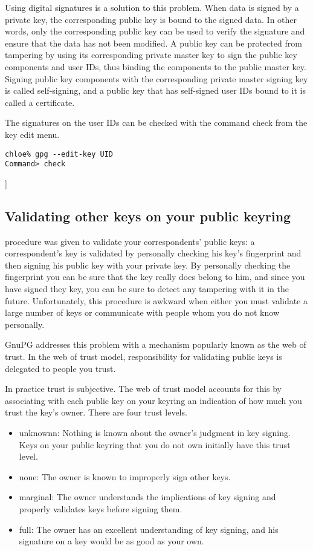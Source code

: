 Using digital signatures is a solution to this problem. When data is signed by
a private key, the corresponding public key is bound to the signed data. In
other words, only the corresponding public key can be used to verify the
signature and ensure that the data has not been modified. A public key can be
protected from tampering by using its corresponding private master key to sign
the public key components and user IDs, thus binding the components to the
public master key. Signing public key components with the corresponding private
master signing key is called self-signing, and a public key that has
self-signed user IDs bound to it is called a certificate.

The signatures on the user IDs can be checked with the command check from the
key edit menu.
\begin{verbatim}
chloe% gpg --edit-key UID
Command> check
\end{verbatim}]

\subsection{Validating other keys on your public keyring}
 procedure was given to validate your correspondents' public keys: a
 correspondent's key is validated by personally checking his key's fingerprint
 and then signing his public key with your private key. By personally checking
 the fingerprint you can be sure that the key really does belong to him, and
 since you have signed they key, you can be sure to detect any tampering with
 it in the future. Unfortunately, this procedure is awkward when either you
 must validate a large number of keys or communicate with people whom you do
 not know personally.

 GnuPG addresses this problem with a mechanism popularly known as the web of
 trust. In the web of trust model, responsibility for validating public keys is
 delegated to people you trust. 


In practice trust is subjective.  The web of trust model accounts for this by associating with each public key on your keyring an indication of how much you trust the key's owner. There are four trust levels.
\begin{itemize}
    \item unknownn:  Nothing is known about the owner's judgment in key
        signing. Keys on your public keyring that you do not own initially have
        this trust level.
    \item none:   The owner is known to improperly sign other keys.
    \item marginal:  The owner understands the implications of key signing and
        properly validates keys before signing them.
    \item full: The owner has an excellent understanding of key signing, and his signature on a key would be as good as your own.
\end{itemize}

